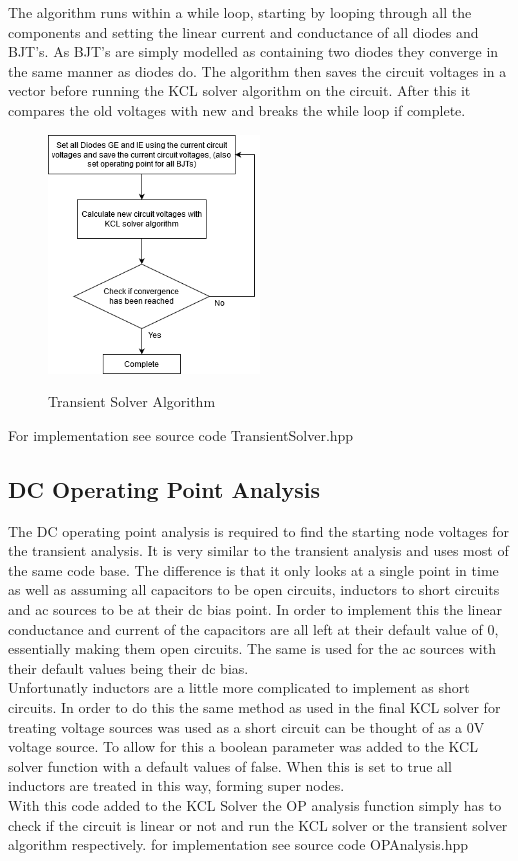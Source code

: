 \documentclass{article}
\begin{document}
The algorithm runs within a while loop, starting by looping through all the components and setting the linear current and conductance of all diodes and BJT's. As BJT's are simply modelled as containing two diodes they converge in the same manner as diodes do. The algorithm then saves the circuit voltages in a vector before running the KCL solver algorithm on the circuit. After this it compares the old voltages with new and breaks the while loop if complete.  

\begin{figure}[h]
    \caption{Transient Solver Algorithm}
    \centering
    \includegraphics[width=0.5\textwidth]{images/TransientSolverAlgorithm.png}
    \label{fig:transient}
\end{figure}
\bigbreak
For implementation see source code TransientSolver.hpp
\newpage

\subsection{DC Operating Point Analysis}\label{ssec:DCanalysis}
The DC operating point analysis is required to find the starting node voltages for the transient analysis. It is very similar to the transient analysis and uses most of the same code base. The difference is that it only looks at a single point in time as well as assuming all capacitors to be open circuits, inductors to short circuits and ac sources to be at their dc bias point. In order to implement this the linear conductance and current of the capacitors are all left at their default value of 0, essentially making them open circuits. The same is used for the ac sources with their default values being their dc bias.\\Unfortunatly inductors are a little more complicated to implement as short circuits. In order to do this the same method as used in the final KCL solver for treating voltage sources was used as a short circuit can be thought of as a 0V voltage source. To allow for this a boolean parameter was added to the KCL solver function with a default values of false. When this is set to true all inductors are treated in this way, forming super nodes.\\
With this code added to the KCL Solver the OP analysis function simply has to check if the circuit is linear or not and run the KCL solver or the transient solver algorithm respectively. 
\bigbreak
for implementation see source code OPAnalysis.hpp
\newpage
\end{document}
